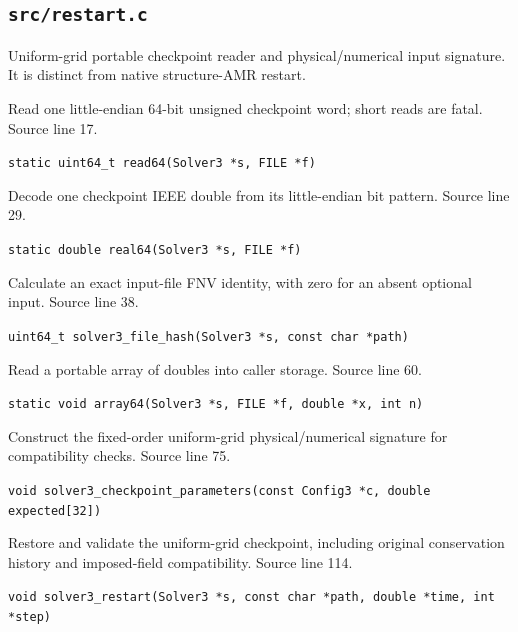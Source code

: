 \subsection{\texttt{src/restart.c}}
Uniform-grid portable checkpoint reader and physical/numerical input signature. It is distinct from native structure-AMR restart.
\begin{description}[style=nextline,leftmargin=0pt,labelindent=0pt,labelwidth=0pt,labelsep=0pt]
\item[\texttt{read64}] Read one little-endian 64-bit unsigned checkpoint word; short reads are fatal. Source line 17.\par
{\small\nolinkurl{static uint64_t read64(Solver3 *s, FILE *f)}}
\item[\texttt{real64}] Decode one checkpoint IEEE double from its little-endian bit pattern. Source line 29.\par
{\small\nolinkurl{static double real64(Solver3 *s, FILE *f)}}
\item[\texttt{solver3\_file\_hash}] Calculate an exact input-file FNV identity, with zero for an absent optional input. Source line 38.\par
{\small\nolinkurl{uint64_t solver3_file_hash(Solver3 *s, const char *path)}}
\item[\texttt{array64}] Read a portable array of doubles into caller storage. Source line 60.\par
{\small\nolinkurl{static void array64(Solver3 *s, FILE *f, double *x, int n)}}
\item[\texttt{solver3\_checkpoint\_parameters}] Construct the fixed-order uniform-grid physical/numerical signature for compatibility checks. Source line 75.\par
{\small\nolinkurl{void solver3_checkpoint_parameters(const Config3 *c, double expected[32])}}
\item[\texttt{solver3\_restart}] Restore and validate the uniform-grid checkpoint, including original conservation history and imposed-field compatibility. Source line 114.\par
{\small\nolinkurl{void solver3_restart(Solver3 *s, const char *path, double *time, int *step)}}
\end{description}
